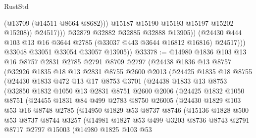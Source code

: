 \begin{lexlean}{RustStd}
\begin{coremodule}
                            (@13709 (@14511 @8664 @8682)))
                          @15187
                          @15190
                          @15193
                          @15197
                          @15202
                          @15208))
                      @24517)))
                @32879
                @32882
                @32885
                @32888
                @13905))
            (@24430 @444 @103 @13 @16 @3644 @2785 (@33037 @443 @3644 @16812 @16816) @24517)))
        @33048
        @33051
        @33054
        @33057
        @13905))
@33378 := @14980
    @1836
    @103
    @13
    @16
    @8757
    @2831
    @2785
    @2791
    @8709
    @2797
    (@24438
      @1836
      @13
      @8757
      (@32926
        @1835
        @18
        @13
        @2831
        @8755
        @2600
        @2013
        (@24425
          @1835
          @18
          @8755
          (@24430
            @1833
            @472
            @13
            @17
            @8753
            @3701
            (@24438
              @1833
              @13
              @8753
              (@32850
                @1832
                @1050
                @13
                @2831
                @8751
                @2600
                @2006
                (@24425
                  @1832
                  @1050
                  @8751
                  (@24455
                    @1831
                    @84
                    @499
                    @2783
                    @8750
                    @26005
                    (@24430
                      @1829
                      @103
                      @53
                      @16
                      @8748
                      @2785
                      (@14950
                        @1829
                        @53
                        @8737
                        @8746
                        (@15136
                          @1828
                          @500
                          @53
                          @8737
                          @8744
                          @3257
                          (@14981
                            @1827
                            @53
                            @499
                            @3203
                            @8736
                            @8743
                            @2791
                            @8717
                            @2797
                            @15003
                            (@14980
                              @1825
                              @103
                              @53

\end{coremodule}
\end{lexlean}
